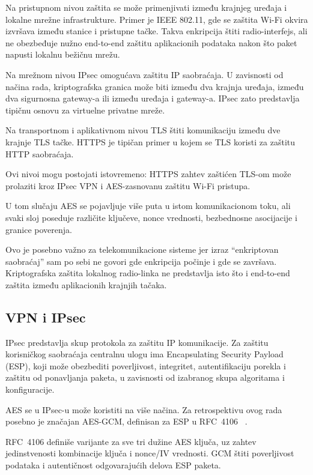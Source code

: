 Na pristupnom nivou zaštita se može primenjivati između krajnjeg
uređaja i lokalne mrežne infrastrukture. Primer je IEEE 802.11,
gde se zaštita Wi-Fi okvira izvršava između stanice i pristupne tačke.
Takva enkripcija štiti radio-interfejs, ali ne obezbeđuje nužno
end-to-end zaštitu aplikacionih podataka nakon što paket napusti lokalnu
bežičnu mrežu.

Na mrežnom nivou IPsec omogućava zaštitu IP saobraćaja. U zavisnosti od
načina rada, kriptografska granica može biti između dva krajnja uređaja,
između dva sigurnosna gateway-a ili između uređaja i gateway-a.
IPsec zato predstavlja tipičnu osnovu za virtuelne privatne mreže.

Na transportnom i aplikativnom nivou TLS štiti komunikaciju između dve
krajnje TLS tačke. HTTPS je tipičan primer u kojem se TLS koristi za
zaštitu HTTP saobraćaja.

Ovi nivoi mogu postojati istovremeno: HTTPS zahtev zaštićen TLS-om može
prolaziti kroz IPsec VPN i AES-zasnovanu zaštitu Wi-Fi pristupa.

U tom slučaju AES se pojavljuje više puta u istom komunikacionom toku,
ali svaki sloj poseduje različite ključeve, nonce vrednosti, bezbednosne
asocijacije i granice poverenja.

Ovo je posebno važno za telekomunikacione sisteme jer izraz
``enkriptovan saobraćaj'' sam po sebi ne govori gde enkripcija počinje i
gde se završava. Kriptografska zaštita lokalnog radio-linka ne
predstavlja isto što i end-to-end zaštita između aplikacionih krajnjih
tačaka.


\subsection{VPN i IPsec}
\label{subsec:ipsec}

IPsec predstavlja skup protokola za zaštitu IP komunikacije. Za zaštitu
korisničkog saobraćaja centralnu ulogu ima Encapsulating Security
Payload (ESP), koji može obezbediti poverljivost, integritet,
autentifikaciju porekla i zaštitu od ponavljanja paketa, u zavisnosti od
izabranog skupa algoritama i konfiguracije.

AES se u IPsec-u može koristiti na više načina. Za retrospektivu ovog
rada posebno je značajan AES-GCM, definisan za ESP u RFC~4106
~\cite{rfc4106}.

RFC~4106 definiše varijante za sve tri dužine AES ključa, uz zahtev
jedinstvenosti kombinacije ključa i nonce/IV vrednosti. GCM štiti
poverljivost podataka i autentičnost odgovarajućih delova ESP paketa.

